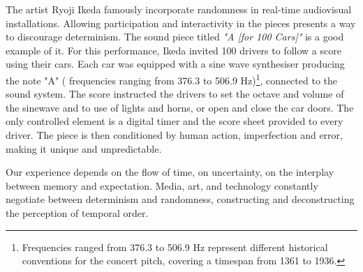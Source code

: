 The artist Ryoji Ikeda famously incorporate randomness in real-time audiovisual installations. Allowing participation and interactivity in the pieces presents a way to discourage determinism. The sound piece titled \textit{"A [for 100 Cars]"} is a good example of it. For this performance, Ikeda invited 100 drivers to follow a score using their cars. Each car was equipped with a sine wave synthesiser producing the note "A" ( frequencies ranging from 376.3 to 506.9 Hz)\footnote{Frequencies ranged from 376.3 to 506.9 Hz represent different historical conventions for the concert pitch, covering a timespan from 1361 to 1936.}, connected to the sound system. The score instructed the drivers to set the octave and volume of the sinewave and to use of lights and horns, or open and close the car doors. The only controlled element is a digital timer and the score sheet provided to every driver. The piece is then conditioned by human action, imperfection and error, making it unique and unpredictable. 

Our experience depends on the flow of time, on uncertainty, on the interplay between memory and expectation. Media, art, and technology constantly negotiate between determinism and randomness, constructing and deconstructing the perception of temporal order.



